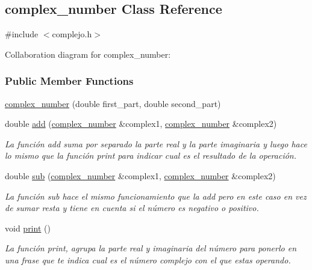 \hypertarget{classcomplex__number}{}\subsection{complex\+\_\+number Class Reference}
\label{classcomplex__number}


{\ttfamily \#include $<$complejo.\+h$>$}



Collaboration diagram for complex\+\_\+number\+:
\subsubsection*{Public Member Functions}
\begin{DoxyCompactItemize}
\item 
\hyperlink{classcomplex__number_a30f1afa4e0aaeaf347f667a503cf63f6}{complex\+\_\+number} (double first\+\_\+part, double second\+\_\+part)
\item 
double \hyperlink{classcomplex__number_ad65b2d6465bb82ba98cc31937268d120}{add} (\hyperlink{classcomplex__number}{complex\+\_\+number} \&complex1, \hyperlink{classcomplex__number}{complex\+\_\+number} \&complex2)
\begin{DoxyCompactList}\small\item\em La función add suma por separado la parte real y la parte imaginaria y luego hace lo mismo que la función print para indicar cual es el resultado de la operación. \end{DoxyCompactList}\item 
double \hyperlink{classcomplex__number_a556956d95765b498f92c44b16ae4a573}{sub} (\hyperlink{classcomplex__number}{complex\+\_\+number} \&complex1, \hyperlink{classcomplex__number}{complex\+\_\+number} \&complex2)
\begin{DoxyCompactList}\small\item\em La función sub hace el mismo funcionamiento que la add pero en este caso en vez de sumar resta y tiene en cuenta si el número es negativo o positivo. \end{DoxyCompactList}\item 
void \hyperlink{classcomplex__number_a8700aec615b980b0c20f8c181ea1d5ff}{print} ()
\begin{DoxyCompactList}\small\item\em La función print, agrupa la parte real y imaginaria del número para ponerlo en una frase que te indica cual es el número complejo con el que estas operando. \end{DoxyCompactList}\end{DoxyCompactItemize}
